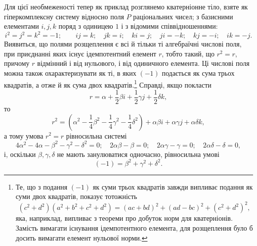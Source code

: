 \documentclass[11pt]{article}
\begin{document}
\noindent Для цієї необмеженості тепер як приклад розглянемо кватерніонне тіло, взяте як гіперкомплексну систему відносно поля $P$ раціональних чисел; з базисними елементами $i,j,k$ поряд з одиницею $1$ і з відомими співвідношеннями:
\[
 i^2=j^2=k^2=-1;\qquad ij=k;\quad jk=i;\quad ki=j;\quad ji=-k;\quad kj=-i;\quad ik=-j.
\]
Виявиться, що полями розщеплення є всі й тільки ті алгебраїчні числові поля, при приєднанні яких існує ідемпотентний елемент $r$, тобто такий, що $r^2=r$, причому $r$ відмінний і від нульового, і від одиничного елемента. Ці числові поля можна також охарактеризувати як ті, в яких $(-1)$ подається як сума трьох квадратів, а отже й як сума двох квадратів.\footnote{Те, що з подання $(-1)$ як суми трьох квадратів завжди випливає подання як суми двох квадратів, показує тотожність
\[
(c^2+d^2)(a^2+b^2+c^2+d^2)=(ac+bd)^2+(ad-bc)^2+(c^2+d^2)^2,
\]
яка, наприклад, випливає з теореми про добуток норм для кватерніонів. Замість вимагати існування ідемпотентного елемента, для розщеплення було б досить вимагати елемент нульової норми.} Справді, якщо покласти
\[
        r=\alpha+\frac12\beta i+\frac12\gamma j+\frac12\delta k,
\]
то
\[
        r^2=\left(\alpha^2-\frac14\beta^2-\frac14\gamma^2-\frac14\delta^2\right)
          +\alpha\beta i+\alpha\gamma j+\alpha\delta k,
\]
а тому умова $r^2=r$ рівносильна системі
\[
4\alpha^2-4\alpha-\beta^2-\gamma^2-\delta^2=0;\quad
2\alpha\beta-\beta=0;\quad 2\alpha\gamma-\gamma=0;\quad 2\alpha\delta-\delta=0,
\]
і, оскільки $\beta,\gamma,\delta$ не мають занулюватися одночасно, рівносильна умові
\[
        (-1)=\beta^2+\gamma^2+\delta^2.
\]
\end{document}
